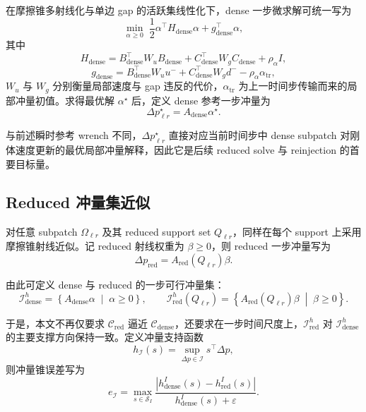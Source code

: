 在摩擦锥多射线化与单边 gap 的活跃集线性化下，dense 一步微求解可统一写为
\begin{equation}
\min_{\alpha \ge 0}
\;
\frac{1}{2}\alpha^{\top} H_{\mathrm{dense}}\alpha
+
g_{\mathrm{dense}}^{\top}\alpha,
\label{eq:dense-micro-qp}
\end{equation}
其中
\begin{equation}
H_{\mathrm{dense}}
=
B_{\mathrm{dense}}^{\top}W_u B_{\mathrm{dense}}
+
C_{\mathrm{dense}}^{\top}W_g C_{\mathrm{dense}}
+
\rho_{\alpha} I,
\end{equation}
\begin{equation}
g_{\mathrm{dense}}
=
B_{\mathrm{dense}}^{\top}W_u u^{-}
+
C_{\mathrm{dense}}^{\top}W_g d^{-}
-
\rho_{\alpha}\alpha_{\mathrm{tr}},
\end{equation}
$W_u$ 与 $W_g$ 分别衡量局部速度与 gap 违反的代价，$\alpha_{\mathrm{tr}}$ 为上一时间步传输而来的局部冲量初值。求得最优解 $\alpha^\star$ 后，定义 dense 参考一步冲量为
\begin{equation}
\Delta p_{\ell r}^{\star}
=
A_{\mathrm{dense}}\alpha^\star.
\end{equation}

与前述瞬时参考 wrench 不同，$\Delta p_{\ell r}^{\star}$ 直接对应当前时间步中 dense subpatch 对刚体速度更新的最优局部冲量解释，因此它是后续 reduced solve 与 reinjection 的首要目标量。

\subsection{Reduced 冲量集近似}

对任意 subpatch $\Omega_{\ell r}$ 及其 reduced support set $Q_{\ell r}$，同样在每个 support 上采用摩擦锥射线近似。记 reduced 射线权重为 $\beta \ge 0$，则 reduced 一步冲量写为
\begin{equation}
\Delta p_{\mathrm{red}}
=
A_{\mathrm{red}}(Q_{\ell r})\beta.
\end{equation}

由此可定义 dense 与 reduced 的一步可行冲量集：
\begin{equation}
\mathcal{I}_{\mathrm{dense}}^{h}
=
\left\{
A_{\mathrm{dense}}\alpha
\;\middle|\;
\alpha \ge 0
\right\},
\qquad
\mathcal{I}_{\mathrm{red}}^{h}(Q_{\ell r})
=
\left\{
A_{\mathrm{red}}(Q_{\ell r})\beta
\;\middle|\;
\beta \ge 0
\right\}.
\end{equation}

于是，本文不再仅要求 $\mathcal{C}_{\mathrm{red}}$ 逼近 $\mathcal{C}_{\mathrm{dense}}$，还要求在一步时间尺度上，$\mathcal{I}_{\mathrm{red}}^{h}$ 对 $\mathcal{I}_{\mathrm{dense}}^{h}$ 的主要支撑方向保持一致。定义冲量支持函数
\begin{equation}
h_{\mathcal{I}}(s)
=
\sup_{\Delta p \in \mathcal{I}} s^{\top}\Delta p,
\end{equation}
则冲量锥误差写为
\begin{equation}
e_{\mathcal{I}}
=
\max_{s\in\mathcal{S}_{I}}
\frac{|h_{\mathrm{dense}}^{I}(s)-h_{\mathrm{red}}^{I}(s)|}
{h_{\mathrm{dense}}^{I}(s)+\varepsilon}.
\end{equation}

